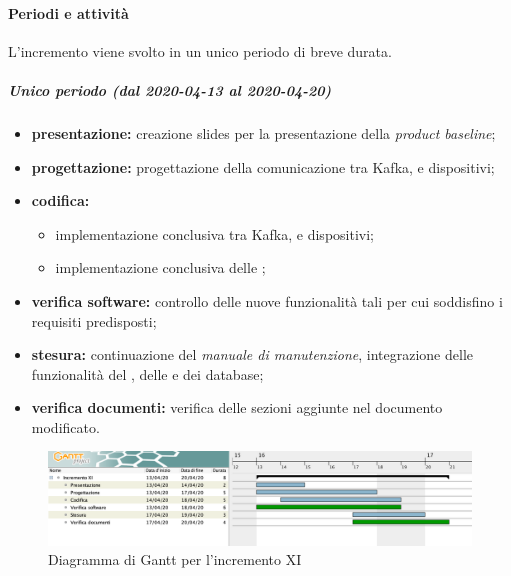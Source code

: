 			\paragraph{Periodi e attività}
			
				L'incremento viene svolto in un unico periodo di breve durata.
				
				\subparagraph{Unico periodo (dal 2020-04-13 al 2020-04-20)}
				
					\begin{itemize}
						\item \textbf{presentazione:} creazione slides per la presentazione della \textit{product baseline};
						\item \textbf{progettazione:} progettazione della comunicazione tra Kafka,  e dispositivi;
						\item \textbf{codifica:} 
						\begin{itemize}
							\item implementazione conclusiva  tra Kafka,  e dispositivi; 
							\item implementazione conclusiva delle ;
						\end{itemize}
						\item \textbf{verifica software:} controllo delle nuove funzionalità tali per cui soddisfino i requisiti predisposti;
						\item \textbf{stesura:} continuazione del \textit{manuale di manutenzione}, integrazione delle funzionalità del , delle  e dei database;
						\item \textbf{verifica documenti:} verifica delle sezioni aggiunte nel documento modificato.
					\end{itemize} 			

		\begin{landscape}
          \begin{figure}[H]
            \centering
            \includegraphics[width=\linewidth]{images/gantt/incrementoXI} %
            \caption{Diagramma di Gantt per l'incremento XI}
          \end{figure}		
		\end{landscape}


